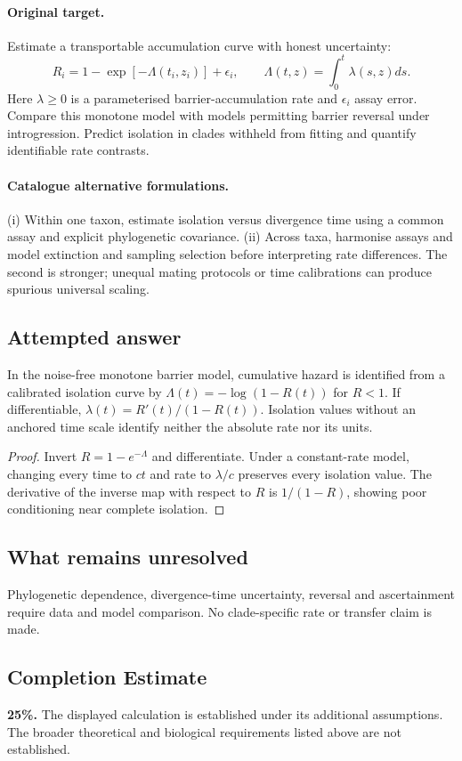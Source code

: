 \documentclass[11pt]{article}
\begin{document}
\paragraph{Original target.}
Estimate a transportable accumulation curve with honest uncertainty:
\[
R_i=1-\exp[-\Lambda(t_i,z_i)]+\epsilon_i,
\qquad
\Lambda(t,z)=\int_0^t\lambda(s,z)ds.
\]
Here $\lambda\geq0$ is a parameterised barrier-accumulation rate and $\epsilon_i$ assay error. Compare this monotone model with models permitting barrier reversal under introgression. Predict isolation in clades withheld from fitting and quantify identifiable rate contrasts.
\paragraph{Catalogue alternative formulations.}
(i) Within one taxon, estimate isolation versus divergence time using a common assay and explicit phylogenetic covariance. (ii) Across taxa, harmonise assays and model extinction and sampling selection before interpreting rate differences. The second is stronger; unequal mating protocols or time calibrations can produce spurious universal scaling.
\subsection{Attempted answer}
\begin{proposition}
In the noise-free monotone barrier model, cumulative hazard is identified from a calibrated isolation curve by $\Lambda(t)=-\log(1-R(t))$ for $R<1$. If differentiable, $\lambda(t)=R\prime(t)/(1-R(t))$. Isolation values without an anchored time scale identify neither the absolute rate nor its units.
\end{proposition}
\begin{proof}
Invert $R=1-e^{-\Lambda}$ and differentiate. Under a constant-rate model, changing every time to $ct$ and rate to $\lambda/c$ preserves every isolation value. The derivative of the inverse map with respect to $R$ is $1/(1-R)$, showing poor conditioning near complete isolation.
\end{proof}
\subsection{What remains unresolved}
Phylogenetic dependence, divergence-time uncertainty, reversal and ascertainment require data and model comparison. No clade-specific rate or transfer claim is made.
\subsection{Completion Estimate}
\textbf{25\%.} The displayed calculation is established under its additional assumptions. The broader theoretical and biological requirements listed above are not established.
\end{document}
